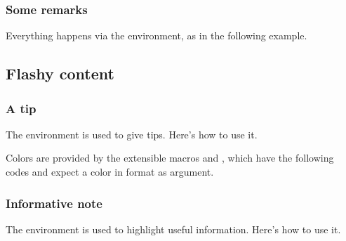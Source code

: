 \subsubsection{Some remarks}

Everything happens via the  environment, as in the following example.




\subsection{Flashy content}

\subsubsection{A tip}

The  environment is used to give tips. Here's how to use it.




\smallskip

\begin{tdocnote}
    Colors are provided by the extensible macros  and , which have the following codes and expect a color in  format as argument.

    \begin{tdoclatex}[code]
    \end{tdoclatex}
\end{tdocnote}



\subsubsection{Informative note}

The  environment is used to highlight useful information. Here's how to use it.





